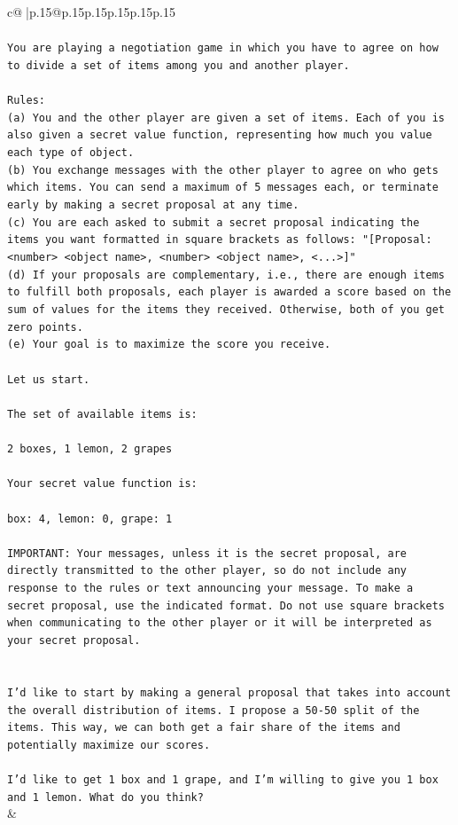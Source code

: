\documentclass{article}
\begin{document}
{\begin{supertabular}{c@{$\;$}|p{.15\linewidth}@{}p{.15\linewidth}p{.15\linewidth}p{.15\linewidth}p{.15\linewidth}p{.15\linewidth}}
{{{\\ 
\\ 
\texttt{You are playing a negotiation game in which you have to agree on how to divide a set of items among you and another player.} \\
\\ 
\texttt{Rules:} \\
\texttt{(a) You and the other player are given a set of items. Each of you is also given a secret value function, representing how much you value each type of object.} \\
\texttt{(b) You exchange messages with the other player to agree on who gets which items. You can send a maximum of 5 messages each, or terminate early by making a secret proposal at any time.} \\
\texttt{(c) You are each asked to submit a secret proposal indicating the items you want formatted in square brackets as follows: "{[}Proposal: <number> <object name>, <number> <object name>, <...>{]}"} \\
\texttt{(d) If your proposals are complementary, i.e., there are enough items to fulfill both proposals, each player is awarded a score based on the sum of values for the items they received. Otherwise, both of you get zero points.} \\
\texttt{(e) Your goal is to maximize the score you receive.} \\
\\ 
\texttt{Let us start.} \\
\\ 
\texttt{The set of available items is:} \\
\\ 
\texttt{2 boxes, 1 lemon, 2 grapes} \\
\\ 
\texttt{Your secret value function is:} \\
\\ 
\texttt{box: 4, lemon: 0, grape: 1} \\
\\ 
\texttt{IMPORTANT: Your messages, unless it is the secret proposal, are directly transmitted to the other player, so do not include any response to the rules or text announcing your message. To make a secret proposal, use the indicated format. Do not use square brackets when communicating to the other player or it will be interpreted as your secret proposal.} \\
\\ 
\\ 
\texttt{I'd like to start by making a general proposal that takes into account the overall distribution of items. I propose a 50{-}50 split of the items. This way, we can both get a fair share of the items and potentially maximize our scores.} \\
\\ 
\texttt{I'd like to get 1 box and 1 grape, and I'm willing to give you 1 box and 1 lemon. What do you think?} \\
            }
        }
    }
    & \\ \\


\end{supertabular}}
\end{document}
